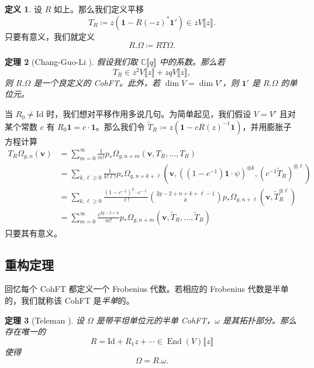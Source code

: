 \documentclass{amsart}
\newtheorem{thm}{定理}[section]
\theoremstyle{definition}
\newtheorem{defn}[thm]{定义}
\theoremstyle{remark}
\theoremstyle{plain}
\theoremstyle{definition}
\theoremstyle{remark}
\newcommand{\C}{\mathbb{C}}
\newcommand{\mbf}[1]{\mathbf{#1}}
\newcommand{\bv}{\mbf{v}}
\newcommand{\mr}[1]{\mathrm{#1}}
\newcommand{\1}{\mathbf{1}}
\newcommand{\2}{\mathbf{2}}
\newcommand{\3}{\mathbf{3}}
\newcommand{\ps}[1]{\llbracket #1 \rrbracket}
\DeclareMathOperator{\End}{End}
\begin{document}
\begin{defn}
    设 $R$ 如上。那么我们定义平移
    \[ T_R \coloneqq z (\1 - R(-z)^* \1') \in z V\ps{z}. \]
    只要有意义，我们就定义
    \[ R.\Omega \coloneqq RT\Omega. \]
\end{defn}

\begin{thm}[Chang-Guo-Li {\cite[Theorem~2.7]{CGL2026}}]
    假设我们取 $\C\ps{q}$ 中的系数。那么若
    \[ T_R \in z^2 V \ps{z} + zq V \ps{z}, \]
    则 $R.\Omega$ 是一个良定义的 CohFT。此外，若 $\dim V = \dim V'$，则 $\1'$ 是 $R.\Omega$ 的单位元。
\end{thm}

当 $R_0 \neq \mr{Id}$ 时，我们想对平移作用多说几句。为简单起见，我们假设 $V = V'$ 且对某个常数 $c$ 有 $R_0 \1 = c \cdot \1$。那么我们令 $\tilde{T}_R \coloneqq z( \1 - c R(z)^{-1} \1)$，并用膨胀子方程计算
\begin{align*}
    T_R \Omega_{g,n}(\bv) &= \sum_{m=0}^{\infty} \frac{1}{m!} p_*\Omega_{g,n+m}(\bv, T_R, \ldots, T_R) \\
    &= \sum_{k,\ell \geq 0} \frac{1}{k!\ell!} p_* \Omega_{g,n+k+\ell}(\bv, ( (1-c^{-1})\1 \cdot \psi )^{\otimes k}, ( c^{-1} \tilde{T}_R )^{\otimes \ell}) \\
    &= \sum_{k,\ell \geq 0} \frac{(1-c^{-1})^k \cdot c^{-\ell}}{\ell!} \binom{2g-2+n+k+\ell-1}{k} p_* \Omega_{g,n+\ell}(\bv, \tilde{T}_R^{\otimes \ell}) \\
    &= \sum_{m=0}^{\infty} \frac{c^{2g-2+n}}{m!} p_* \Omega_{g,n+m}(\bv, \tilde{T}_R, \ldots, \tilde{T}_R)
\end{align*}
只要其有意义。


\subsection{重构定理}%
\label{sub:Reconstruction theorem}

回忆每个 CohFT 都定义一个 Frobenius 代数。若相应的 Frobenius 代数是半单的，我们就称该 CohFT 是\textit{半单}的。

\begin{thm}[Teleman {\cite{Teleman2012}}]%
\label{thm:teleman}
    设 $\Omega$ 是带平坦单位元的半单 CohFT，$\omega$ 是其拓扑部分。那么存在唯一的
    \[ R = \mr{Id} + R_1 z + \cdots \in \End(V)\ps{z} \]
    使得
    \[ \Omega = R.\omega. \]
\end{thm}
\end{document}
